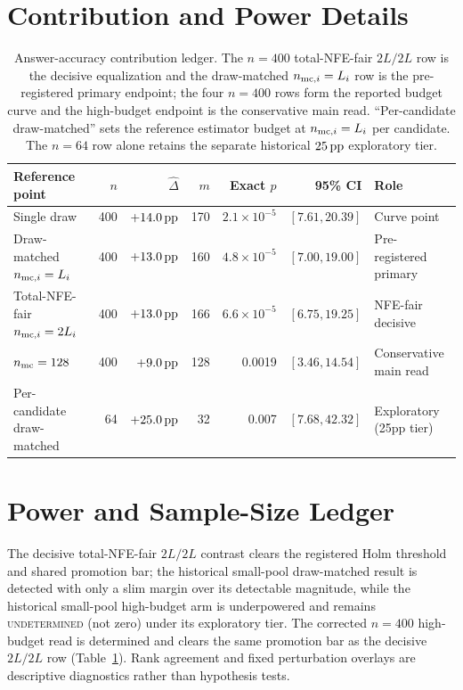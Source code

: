 \section{Contribution and Power Details}
\label{app:contribceiling}

\begin{table}[H]
\centering
\small
\caption{Answer-accuracy contribution ledger.  The $n=400$ total-NFE-fair
$2L/2L$ row is the decisive equalization and the draw-matched
$n_{{\rm mc},i}=L_i$ row is the pre-registered primary endpoint; the four
$n=400$ rows form the reported budget curve and the high-budget endpoint is the
conservative main read.  ``Per-candidate draw-matched'' sets the reference
estimator budget at $n_{{\rm mc},i}=L_i$ per candidate.  The $n=64$ row alone
retains the separate historical $25\,\mathrm{pp}$ exploratory tier.}
\label{tab:compute-contrast}
\begin{tabular}{@{}lrrrrr>{\raggedright\arraybackslash}p{2.2cm}@{}}
\toprule
Reference point & $n$ & $\widehat\Delta$ & $m$ & Exact $p$ & 95\% CI & Role \\
\midrule
Single draw & 400 & $+14.0\,\mathrm{pp}$ & 170 & $2.1\times10^{-5}$ & $[7.61,20.39]$ & Curve point \\
Draw-matched $n_{{\rm mc},i}=L_i$ & 400 & $+13.0\,\mathrm{pp}$ & 160 & $4.8\times10^{-5}$ & $[7.00,19.00]$ & Pre-registered primary \\
Total-NFE-fair $n_{{\rm mc},i}=2L_i$ & 400 & $+13.0\,\mathrm{pp}$ & 166 & $6.6\times10^{-5}$ & $[6.75,19.25]$ & NFE-fair decisive \\
$n_{\rm mc}=128$ & 400 & $+9.0\,\mathrm{pp}$ & 128 & 0.0019 & $[3.46,14.54]$ & Conservative main read \\
Per-candidate draw-matched & 64 & $+25.0\,\mathrm{pp}$ & 32 & 0.007 & $[7.68,42.32]$ & Exploratory (25pp tier) \\
\bottomrule
\end{tabular}
\end{table}

\section{Power and Sample-Size Ledger}
\label{app:powerledger}
The decisive total-NFE-fair $2L/2L$ contrast clears the registered Holm
threshold and shared promotion bar; the historical small-pool draw-matched result is detected
with only a slim margin over its detectable magnitude, while the historical
small-pool high-budget arm is underpowered and remains \textsc{undetermined}
(not zero) under its exploratory tier.  The corrected $n=400$ high-budget read
is determined and clears the same promotion bar as the decisive $2L/2L$ row
(Table~\ref{tab:compute-contrast}).  Rank agreement and fixed perturbation
overlays are descriptive diagnostics rather than hypothesis tests.

